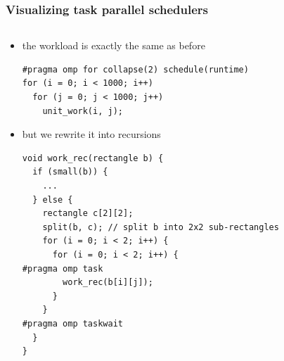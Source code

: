 \documentclass[12pt,dvipdfmx]{beamer}
\begin{document}
\iffalse
\begin{frame}[fragile]
\frametitle{Visualizing task parallel schedulers}
\begin{columns}
\begin{column}{0.7\textwidth}
\begin{itemize}
\item the workload is exactly the same as before
\begin{lstlisting}
#pragma omp for collapse(2) schedule(runtime)
for (i = 0; i < 1000; i++)
  for (j = 0; j < 1000; j++)
    unit_work(i, j);
\end{lstlisting}
\item but we rewrite it into recursions
\begin{lstlisting}
void work_rec(rectangle b) {
  if (small(b)) {
    ...
  } else {
    rectangle c[2][2];
    split(b, c); // split b into 2x2 sub-rectangles
    for (i = 0; i < 2; i++) {
      for (i = 0; i < 2; i++) {
#pragma omp task 
        work_rec(b[i][j]);
      }
    }
#pragma omp taskwait
  }
}
\end{lstlisting}
\end{itemize}
\end{column}

\begin{column}{0.3\textwidth}
\begin{center}
\def\svgwidth{\textwidth}
{\scriptsize }
\end{center}
\end{column}
\end{columns}
\end{frame}
\end{document}
